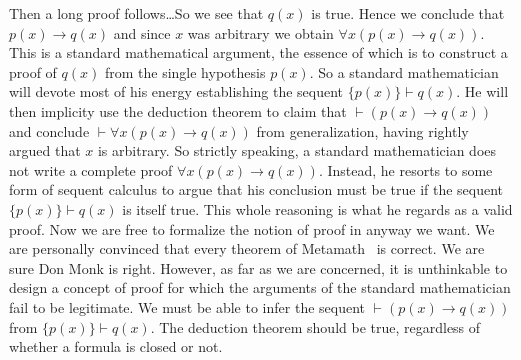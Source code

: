 Then a long proof follows\ldots So we see that $q(x)$ is true. Hence
we conclude that $p(x)\to q(x)$ and since $x$ was arbitrary we
obtain $\forall x(p(x)\to q(x))$. This is a standard mathematical
argument, the essence of which is to construct a proof of $q(x)$
from the single hypothesis $p(x)$. So a standard mathematician will
devote most of his energy establishing the sequent $\{p(x)\}\vdash
q(x)$. He will then implicity use the deduction theorem to claim
that $\vdash (p(x)\to q(x))$ and conclude $\vdash\forall x(p(x)\to
q(x))$ from generalization, having rightly argued that $x$ is
arbitrary. So strictly speaking, a standard mathematician does not
write a complete proof $\forall x(p(x)\to q(x))$. Instead, he
resorts to some form of sequent calculus to argue that his
conclusion must be true if the sequent $\{p(x)\}\vdash q(x)$ is
itself true. This whole reasoning is what he regards as a valid
proof. Now we are free to formalize the notion of proof in anyway we
want. We are personally convinced that every theorem of
Metamath~\cite{Metamath} is correct. We are sure Don Monk is right.
However, as far as we are concerned, it is unthinkable to design a
concept of proof for which the arguments of the standard
mathematician fail to be legitimate. We must be able to infer the
sequent $\vdash (p(x)\to q(x))$ from $\{p(x)\}\vdash q(x)$. The
deduction theorem should be true, regardless of whether a formula is
closed or not.

